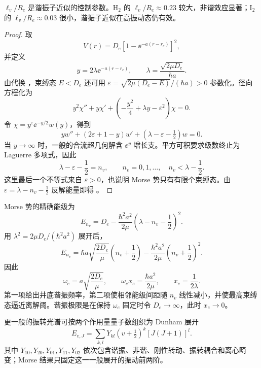 \(\ell_v/R_e\) 是谐振子近似的控制参数。H\(_2\) 的 \(\ell_v/R_e\approx0.23\) 较大，非谐效应显著；I\(_2\) 的 \(\ell_v/R_e\approx0.03\) 很小，谐振子近似在高振动态仍有效。

\begin{proof}
取
\begin{equation}
 V(r)=D_e[1-\ee^{-a(r-r_e)}]^2,
 \label{eq:morse-potential}
\end{equation}
并定义
\begin{equation}
 y=2\lambda\ee^{-a(r-r_e)},\qquad
 \lambda=\frac{\sqrt{2\mu D_e}}{\hbar a}.
 \label{eq:morse-variable-change}
\end{equation}
由代换 ，束缚态 \(E<D_e\) 还可用
\(\varepsilon=\sqrt{2\mu(D_e-E)}/(\hbar a)>0\) 参数化。径向方程化为
\[
 y^2\chi''+y\chi'
 +\left(-\frac{y^2}{4}+\lambda y-\varepsilon^2\right)\chi=0.
\]
令 \(\chi=y^\varepsilon \ee^{-y/2}w(y)\)，得到
\begin{equation}
 y w''+(2\varepsilon+1-y)w'
 +(\lambda-\varepsilon-\tfrac12)w=0 .
 \label{eq:morse-kummer}
\end{equation}
当 \(y\to\infty\) 时，一般的合流超几何解含 \(\ee^y\) 增长支。平方可积要求级数终止为 Laguerre 多项式，因此
\begin{equation}
 \lambda-\varepsilon-\frac12=n_v,\qquad
 n_v=0,1,\ldots,\quad n_v<\lambda-\frac12 .
 \label{eq:morse-quantization}
\end{equation}
这里最后一个不等式来自 \(\varepsilon>0\)，也说明 Morse 势只有有限个束缚态。由
\(\varepsilon=\lambda-n_v-\tfrac12\) 反解能量即得
。
\end{proof}

Morse 势的精确能级为
\begin{equation}
 E_{n_v}=D_e-\frac{\hbar^2a^2}{2\mu}
 \left(\lambda-n_v-\frac12\right)^2 .
 \label{eq:morse-exact-levels}
\end{equation}
用 \(\lambda^2=2\mu D_e/(\hbar^2a^2)\) 展开后，
\begin{equation}
 E_{n_v}
 =\hbar a\sqrt{\frac{2D_e}{\mu}}\left(n_v+\frac12\right)
 -\frac{\hbar^2a^2}{2\mu}\left(n_v+\frac12\right)^2 .
 \label{eq:morse-exact-levels-expanded}
\end{equation}
因此
\begin{equation}
 \omega_e=a\sqrt{\frac{2D_e}{\mu}},\qquad
 \omega_ex_e=\frac{\hbar a^2}{2\mu},\qquad
 x_e=\frac1{2\lambda}.
 \label{eq:morse-anharmonic-constants}
\end{equation}
第一项给出井底谐振频率，第二项使相邻能级间距随 \(n_v\) 线性减小，并使最高束缚态逼近离解阈。谐振极限是在保持 \(\omega_e\) 固定时令
\(D_e\to\infty\)，此时 \(x_e\to0\)。

更一般的振转光谱可按两个作用量量子数组织为 Dunham 展开
\begin{equation}
 E_{v,J}=\sum_{k,l}Y_{kl}
 (v+\tfrac12)^k[J(J+1)]^l .
 \label{eq:phys-dv-dunham}
\end{equation}
其中 \(Y_{10},Y_{20},Y_{01},Y_{11},Y_{02}\) 依次包含谐振、非谐、刚性转动、振转耦合和离心畸变；Morse 结果只固定这一一般展开的振动前两阶。
